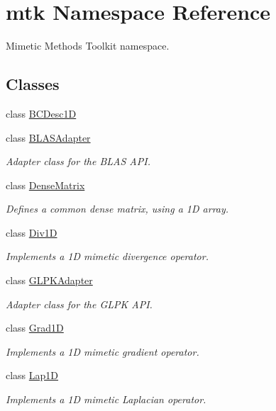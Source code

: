 \hypertarget{namespacemtk}{\section{mtk Namespace Reference}
\label{namespacemtk}
}


Mimetic Methods Toolkit namespace.  


\subsection*{Classes}
\begin{DoxyCompactItemize}
\item 
class \hyperlink{classmtk_1_1BCDesc1D}{B\-C\-Desc1\-D}
\item 
class \hyperlink{classmtk_1_1BLASAdapter}{B\-L\-A\-S\-Adapter}
\begin{DoxyCompactList}\small\item\em Adapter class for the B\-L\-A\-S A\-P\-I. \end{DoxyCompactList}\item 
class \hyperlink{classmtk_1_1DenseMatrix}{Dense\-Matrix}
\begin{DoxyCompactList}\small\item\em Defines a common dense matrix, using a 1\-D array. \end{DoxyCompactList}\item 
class \hyperlink{classmtk_1_1Div1D}{Div1\-D}
\begin{DoxyCompactList}\small\item\em Implements a 1\-D mimetic divergence operator. \end{DoxyCompactList}\item 
class \hyperlink{classmtk_1_1GLPKAdapter}{G\-L\-P\-K\-Adapter}
\begin{DoxyCompactList}\small\item\em Adapter class for the G\-L\-P\-K A\-P\-I. \end{DoxyCompactList}\item 
class \hyperlink{classmtk_1_1Grad1D}{Grad1\-D}
\begin{DoxyCompactList}\small\item\em Implements a 1\-D mimetic gradient operator. \end{DoxyCompactList}\item 
class \hyperlink{classmtk_1_1Lap1D}{Lap1\-D}
\begin{DoxyCompactList}\small\item\em Implements a 1\-D mimetic Laplacian operator. \end{DoxyCompactList}\item 

\end{DoxyCompactItemize}
